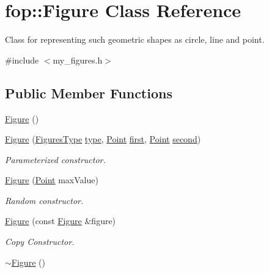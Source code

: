\hypertarget{classfop_1_1_figure}{}\section{fop\+:\+:Figure Class Reference}
\label{classfop_1_1_figure}


Class for representing such geometric shapes as circle, line and point.  




{\ttfamily \#include $<$my\+\_\+figures.\+h$>$}

\subsection*{Public Member Functions}
\begin{DoxyCompactItemize}
\item 
\mbox{\hyperlink{classfop_1_1_figure_a624b2de787892723cbc48e67e847a2d6}{Figure}} ()
\item 
\mbox{\hyperlink{classfop_1_1_figure_af2154691492fa9cc825c7b4fc3224567}{Figure}} (\mbox{\hyperlink{namespacefop_a60dafe2e1ac5bb402dad57ecacde23d5}{Figures\+Type}} \mbox{\hyperlink{classfop_1_1_figure_ab3800215a1229d637bae3c24cfc59e08}{type}}, \mbox{\hyperlink{structtdp_1_1_point}{Point}} \mbox{\hyperlink{classfop_1_1_figure_afac8422d33b66489e3a7ddda4751d219}{first}}, \mbox{\hyperlink{structtdp_1_1_point}{Point}} \mbox{\hyperlink{classfop_1_1_figure_a10aa53d6dcfa427b06ebcf93ae6075b9}{second}})
\begin{DoxyCompactList}\small\item\em Parameterized constructor. \end{DoxyCompactList}\item 
\mbox{\hyperlink{classfop_1_1_figure_a2e24606aff7c6e923d3b1db4cb7f39df}{Figure}} (\mbox{\hyperlink{structtdp_1_1_point}{Point}} max\+Value)
\begin{DoxyCompactList}\small\item\em Random constructor. \end{DoxyCompactList}\item 
\mbox{\hyperlink{classfop_1_1_figure_a2cc70342facf7064e5724651e351046b}{Figure}} (const \mbox{\hyperlink{classfop_1_1_figure}{Figure}} \&figure)
\begin{DoxyCompactList}\small\item\em Copy Constructor. \end{DoxyCompactList}\item 
\mbox{\hyperlink{classfop_1_1_figure_ac17b0b902f9d4963f1b98b52e03e7953}{$\sim$\+Figure}} ()

\end{DoxyCompactItemize}
